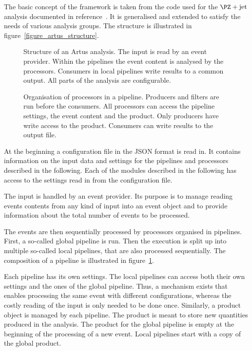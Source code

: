 \documentclass[a4paper, oneside, 10pt]{scrartcl}
\begin{document}
The basic concept of the framework is taken from the code used for the $\PZ+\text{jet}$ analysis documented in reference~\cite{joram_phd}. It is generalised and extended to satisfy the needs of various analysis groups. The structure is illustrated in figure~\ref{figure_artus_structure}.

\begin{figure}[p]
\centering 
\caption[Structure of an Artus analysis.]{Structure of an Artus analysis. The input is read by an event provider. Within the pipelines the event content is analysed by the processors. Consumers in local pipelines write results to a common output. All parts of the analysis are configurable.}
\label{figure_artus_structure}

\vspace{10ex}

\centering 
\caption[Organisation of processors in a pipeline.]{Organisation of processors in a pipeline. Producers and filters are run before the consumers. All processors can access the pipeline settings, the event content and the product. Only producers have write access to the product. Consumers can write results to the output file.}
\label{figure_artus_pipeline}
\end{figure}

At the beginning a configuration file in the JSON format is read in. It contains information on the input data and settings for the pipelines and processors described in the following. Each of the modules described in the following has access to the settings read in from the configuration file.

The input is handled by an event provider. Its purpose is to manage reading events contents from any kind of input into an event object and to provide information about the total number of events to be processed.

The events are then sequentially processed by processors organised in pipelines. First, a so-called global pipeline is run. Then the execution is split up into multiple so-called local pipelines, that are also processed sequentially. The composition of a pipeline is illustrated in figure~\ref{figure_artus_pipeline}.

Each pipeline has its own settings. The local pipelines can access both their own settings and the ones of the global pipeline. Thus, a mechanism exists that enables processing the same event with different configurations, whereas the costly reading of the input is only needed to be done once. Similarly, a product object is managed by each pipeline. The product is meant to store new quantities produced in the analysis. The product for the global pipeline is empty at the beginning of the processing of a new event. Local pipelines start with a copy of the global product.
\end{document}

